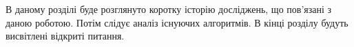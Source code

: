 В даному розділі буде розглянуто коротку історію досліджень,
що пов'язані з даною роботою.
Потім слідує аналіз існуючих алгоритмів.
В кінці розділу будуть висвітлені відкриті питання.
